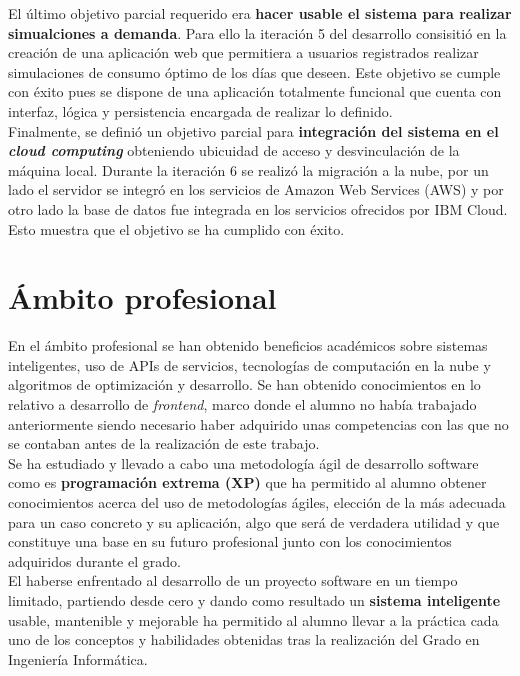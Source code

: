 El último objetivo parcial requerido era \textbf{hacer usable el sistema para realizar simualciones a demanda}. Para ello la iteración 5 del desarrollo consisitió en la creación de una aplicación web que permitiera a usuarios registrados realizar simulaciones de consumo óptimo de los días que deseen. Este objetivo se cumple con éxito pues se dispone de una aplicación totalmente funcional que cuenta con interfaz, lógica y persistencia encargada de realizar lo definido.\\

Finalmente, se definió un objetivo parcial para \textbf{integración del sistema en el \textit{cloud computing}} obteniendo ubicuidad de acceso y desvinculación de la máquina local. Durante la iteración 6 se realizó la migración a la nube, por un lado el servidor se integró en los servicios de Amazon Web Services (AWS) y por otro lado la base de datos fue integrada en los servicios ofrecidos por IBM Cloud. Esto muestra que el objetivo se ha cumplido con éxito.\\
\section{Ámbito profesional}
En el ámbito profesional se han obtenido beneficios académicos sobre sistemas inteligentes, uso de APIs de servicios, tecnologías de computación en la nube y algoritmos de optimización y desarrollo. Se han obtenido conocimientos en lo relativo a desarrollo de \textit{frontend}, marco donde el alumno no había trabajado anteriormente siendo necesario haber adquirido unas competencias con las que no se contaban antes de la realización de este trabajo.\\
Se ha estudiado y llevado a cabo una metodología ágil de desarrollo software como es \textbf{programación extrema (XP)} que ha permitido al alumno obtener conocimientos acerca del uso de metodologías ágiles, elección de la más adecuada para un caso concreto y su aplicación, algo que será de verdadera utilidad y que constituye una base en su futuro profesional junto con los conocimientos adquiridos durante el grado.\\

El haberse enfrentado al desarrollo de un proyecto software en un tiempo limitado, partiendo desde cero y dando como resultado un \textbf{sistema inteligente} usable, mantenible y mejorable ha permitido al alumno llevar a la práctica cada uno de los conceptos y habilidades obtenidas tras la realización del Grado en Ingeniería Informática.\\

